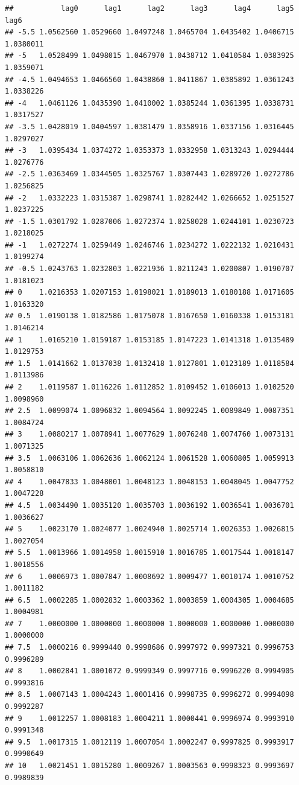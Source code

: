 \documentclass[
]{book}
\begin{document}
\begin{verbatim}
##           lag0      lag1      lag2      lag3      lag4      lag5      lag6
## -5.5 1.0562560 1.0529660 1.0497248 1.0465704 1.0435402 1.0406715 1.0380011
## -5   1.0528499 1.0498015 1.0467970 1.0438712 1.0410584 1.0383925 1.0359071
## -4.5 1.0494653 1.0466560 1.0438860 1.0411867 1.0385892 1.0361243 1.0338226
## -4   1.0461126 1.0435390 1.0410002 1.0385244 1.0361395 1.0338731 1.0317527
## -3.5 1.0428019 1.0404597 1.0381479 1.0358916 1.0337156 1.0316445 1.0297027
## -3   1.0395434 1.0374272 1.0353373 1.0332958 1.0313243 1.0294444 1.0276776
## -2.5 1.0363469 1.0344505 1.0325767 1.0307443 1.0289720 1.0272786 1.0256825
## -2   1.0332223 1.0315387 1.0298741 1.0282442 1.0266652 1.0251527 1.0237225
## -1.5 1.0301792 1.0287006 1.0272374 1.0258028 1.0244101 1.0230723 1.0218025
## -1   1.0272274 1.0259449 1.0246746 1.0234272 1.0222132 1.0210431 1.0199274
## -0.5 1.0243763 1.0232803 1.0221936 1.0211243 1.0200807 1.0190707 1.0181023
## 0    1.0216353 1.0207153 1.0198021 1.0189013 1.0180188 1.0171605 1.0163320
## 0.5  1.0190138 1.0182586 1.0175078 1.0167650 1.0160338 1.0153181 1.0146214
## 1    1.0165210 1.0159187 1.0153185 1.0147223 1.0141318 1.0135489 1.0129753
## 1.5  1.0141662 1.0137038 1.0132418 1.0127801 1.0123189 1.0118584 1.0113986
## 2    1.0119587 1.0116226 1.0112852 1.0109452 1.0106013 1.0102520 1.0098960
## 2.5  1.0099074 1.0096832 1.0094564 1.0092245 1.0089849 1.0087351 1.0084724
## 3    1.0080217 1.0078941 1.0077629 1.0076248 1.0074760 1.0073131 1.0071325
## 3.5  1.0063106 1.0062636 1.0062124 1.0061528 1.0060805 1.0059913 1.0058810
## 4    1.0047833 1.0048001 1.0048123 1.0048153 1.0048045 1.0047752 1.0047228
## 4.5  1.0034490 1.0035120 1.0035703 1.0036192 1.0036541 1.0036701 1.0036627
## 5    1.0023170 1.0024077 1.0024940 1.0025714 1.0026353 1.0026815 1.0027054
## 5.5  1.0013966 1.0014958 1.0015910 1.0016785 1.0017544 1.0018147 1.0018556
## 6    1.0006973 1.0007847 1.0008692 1.0009477 1.0010174 1.0010752 1.0011182
## 6.5  1.0002285 1.0002832 1.0003362 1.0003859 1.0004305 1.0004685 1.0004981
## 7    1.0000000 1.0000000 1.0000000 1.0000000 1.0000000 1.0000000 1.0000000
## 7.5  1.0000216 0.9999440 0.9998686 0.9997972 0.9997321 0.9996753 0.9996289
## 8    1.0002841 1.0001072 0.9999349 0.9997716 0.9996220 0.9994905 0.9993816
## 8.5  1.0007143 1.0004243 1.0001416 0.9998735 0.9996272 0.9994098 0.9992287
## 9    1.0012257 1.0008183 1.0004211 1.0000441 0.9996974 0.9993910 0.9991348
## 9.5  1.0017315 1.0012119 1.0007054 1.0002247 0.9997825 0.9993917 0.9990649
## 10   1.0021451 1.0015280 1.0009267 1.0003563 0.9998323 0.9993697 0.9989839

\end{verbatim}
\end{document}
